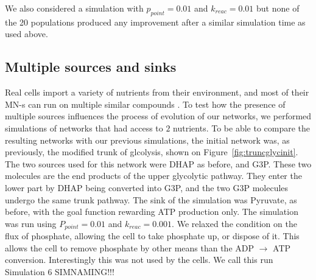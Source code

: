 \documentclass[a4paper,12pt]{article}
\begin{document}
We also considered a simulation with $p_{point}=0.01$ and $k_{reac}=0.01$ but none of the 20 populations produced any improvement after a similar simulation time as used above. 




\subsection{Multiple sources and sinks}
\label{sub:multiple_sources_and_sinks}

Real cells import a variety of nutrients from their environment, and most of their MN-s can run on multiple similar compounds \cite{latent}. To test how the presence of multiple sources influences the process of evolution of our networks, we performed simulations of networks that had access to $2$ nutrients. To be able to compare the resulting networks with our previous simulations, the initial network was, as previously, the modified trunk of glcolysis, shown on Figure~\ref{fig:truncglycinit}. The two sources used for this network were DHAP as before, and G3P. These two molecules are the end products of the upper glycolytic pathway. They enter the lower part by DHAP being converted into G3P, and the two G3P molecules undergo the same trunk pathway. The sink of the simulation was Pyruvate, as before, with the goal function rewarding ATP production only. The simulation was run using $P_{point}=0.01$ and $k_{reac}=0.001$. We relaxed the condition on the flux of phosphate, allowing the cell to take phosphate up, or dispose of it. This allows the cell to remove phosphate by other means than the ADP $\rightarrow$ ATP conversion. Interestingly this was not used by the cells. We call this run Simulation 6 SIMNAMING!!!
\end{document}

